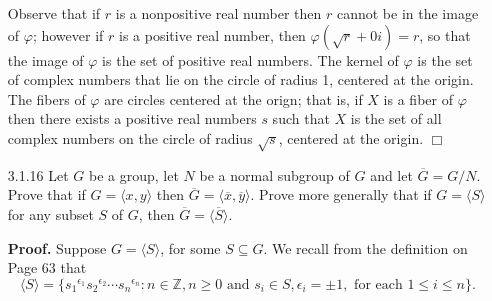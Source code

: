 \documentclass[9pt]{article}
\newcommand{\qed}{\hfill \ensuremath{\Box}}
\newcommand{\cyc}[1]{\langle #1 \rangle}
\newcommand{\Z}{\mathbb{Z}}
\begin{document}
\begin{enumerate}
      Observe that if $r$ is a nonpositive real number then $r$ cannot be in the
      image of $\varphi$; however if $r$ is a positive real number, then
      $\varphi(\sqrt{r}+0i) = r$, so that the image of $\varphi$ is the set of
      positive real numbers.
      The kernel of $\varphi$ is the set of complex numbers that lie on the
      circle of radius 1, centered at the origin. The fibers of $\varphi$ are
      circles centered at the orign; that is, if $X$ is a fiber of $\varphi$
      then there exists a positive real numbers $s$ such that $X$ is the set of
      all complex numbers on the circle of radius $\sqrt{s}$, centered at the
      origin. \qed
   \item[3.1.16]  Let $G$ be a group, let $N$ be a normal subgroup of $G$ and
                  let $\overline{G} = G/N$. Prove that if $G = \cyc{x, y}$ then
                  $\overline{G} = \cyc{\overline{x}, \overline{y}}$. Prove more
                  generally that if $G = \cyc{S}$ for any subset $S$ of $G$,
                  then $\overline{G} = \cyc{\overline{S}}$.
                  
      \textbf{Proof.} Suppose $G = \cyc{S}$, for some $S \subseteq G$. We
      recall from the definition on Page 63 that
      $$\cyc{S} = \{{s_1}^{\epsilon_1}{s_2}^{\epsilon_2}
        \cdots{s_n}^{\epsilon_n} : n \in \Z, n \ge 0 \text{ and }s_i \in S,
        \epsilon_i = \pm 1, \text{ for each } 1 \le i \le n\}.$$
        

\end{enumerate}
\end{document}
